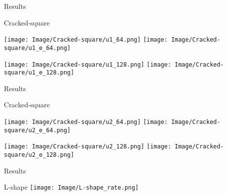 \documentclass[13pt]{beamer}
\begin{document}
\begin{frame}[shrink=5]{Results}
  \begin{block}{Cracked-square}
   \begin{center}
     \texttt{[image: Image/Cracked-square/u1\_64.png]}
     \texttt{[image: Image/Cracked-square/u1\_e\_64.png]}
   \end{center}
   \begin{center}
     \texttt{[image: Image/Cracked-square/u1\_128.png]}
     \texttt{[image: Image/Cracked-square/u1\_e\_128.png]}
   \end{center}
  \end{block}
\end{frame}

\begin{frame}[shrink=5]{Results}
  \begin{block}{Cracked-square}
  \begin{center}
     \texttt{[image: Image/Cracked-square/u2\_64.png]}
     \texttt{[image: Image/Cracked-square/u2\_e\_64.png]}
   \end{center}
   \begin{center}
     \texttt{[image: Image/Cracked-square/u2\_128.png]}
     \texttt{[image: Image/Cracked-square/u2\_e\_128.png]}
   \end{center}
  \end{block}
\end{frame}

\begin{frame}[shrink=5]{Results}
  \begin{block}{L-shape}
     \texttt{[image: Image/L-shape\_rate.png]}
  \end{block}
\end{frame}

\end{document}
